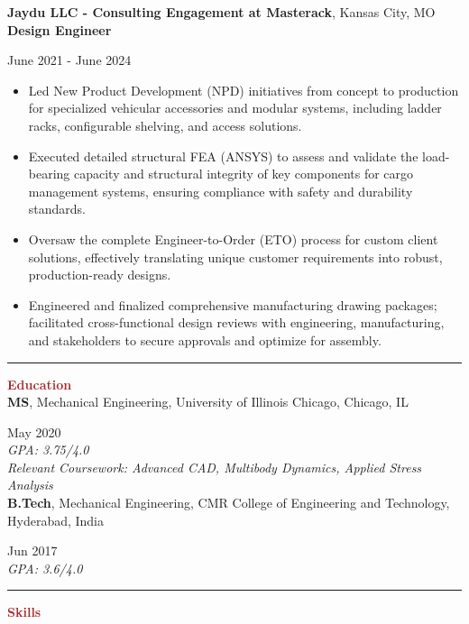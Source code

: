 \documentclass[11pt, letterpaper]{article}
\begin{document}
\textbf{Jaydu LLC - Consulting Engagement at Masterack}, Kansas City, MO\\
\textbf{Design Engineer}\hfill \raggedright{June 2021 - June 2024}\\ %
\begin{itemize}[leftmargin=*, label=\textbullet]
\setlength\itemsep{-2pt}
\vspace{-8pt}
\item Led New Product Development (NPD) initiatives from concept to production for specialized vehicular accessories and modular systems, including ladder racks, configurable shelving, and access solutions.
\item Executed detailed structural FEA (ANSYS) to assess and validate the load-bearing capacity and structural integrity of key components for cargo management systems, ensuring compliance with safety and durability standards.
\item Oversaw the complete Engineer-to-Order (ETO) process for custom client solutions, effectively translating unique customer requirements into robust, production-ready designs.
\item Engineered and finalized comprehensive manufacturing drawing packages; facilitated cross-functional design reviews with engineering, manufacturing, and stakeholders to secure approvals and optimize for assembly.
\end{itemize}
\vspace{-8pt}
\noindent \rule[2pt]{\textwidth}{0.5pt}
\noindent \textbf{\large \textcolor{Brown}{Education}}\vspace{2pt}\\
\textbf{MS}, Mechanical Engineering, University of Illinois Chicago, Chicago, IL \hfill \raggedright{May 2020}\\
\textit{GPA: 3.75/4.0}\\
\textit{Relevant Coursework: Advanced CAD, Multibody Dynamics, Applied Stress Analysis}\\ %
\vspace{6pt}
\textbf{B.Tech}, Mechanical Engineering, CMR College of Engineering and Technology, Hyderabad, India \hfill \raggedright{Jun 2017}\\
\textit{GPA: 3.6/4.0}\\
\vspace{-2pt}
 \noindent \rule[2pt]{\textwidth}{0.5pt}
\noindent \textbf{\large \textcolor{Brown}{Skills}}\vspace{2pt}\\
\end{document}
